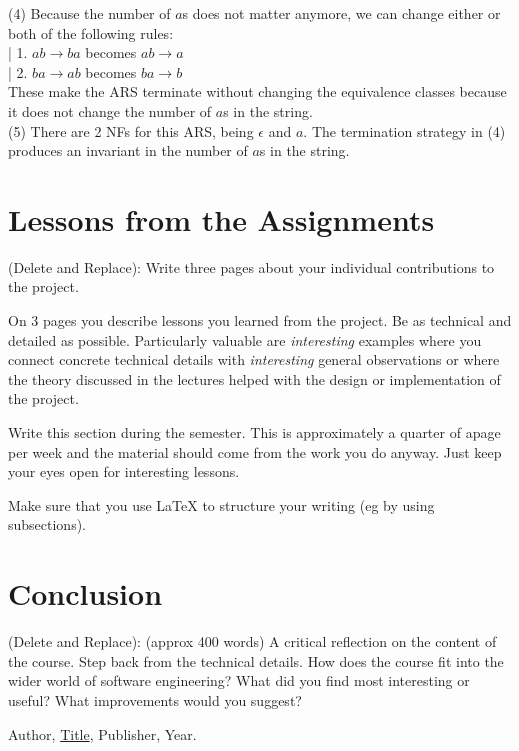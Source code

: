 \documentclass{article}
\theoremstyle{theorem}
\theoremstyle{definition}
\theoremstyle{remark}
\begin{document}
  (4) Because the number of $a$s does not matter anymore, we can change either or both of the following rules:\\
    |    1. $ab \rightarrow ba$ becomes $ab \rightarrow a$\\
    |    2. $ba \rightarrow ab$ becomes $ba \rightarrow b$\\
    These make the ARS terminate without changing the equivalence classes because it does not change the number of $a$s in the string.\\

  (5) There are 2 NFs for this ARS, being $\epsilon$ and $a$. The termination strategy in (4) produces an invariant in the number of $a$s in the string.\\

\section{Lessons from the Assignments}

(Delete and Replace): Write three pages about your individual contributions to the project.

On 3 pages you describe lessons you learned from the project. Be as technical and detailed as possible. Particularly valuable are \emph{interesting} examples where you connect concrete technical details with \emph{interesting} general observations or where the theory discussed in the lectures helped with the design or implementation of the project.

Write this section during the semester. This is approximately a quarter of apage per week and the material should come from the work you do anyway. Just keep your eyes open for interesting lessons.

Make sure that you use \LaTeX{} to structure your writing (eg by using subsections).

\section{Conclusion}\label{conclusion}

(Delete and Replace): (approx 400 words) A critical reflection on the content of the course. Step back from the technical details. How does the course fit into the wider world of software engineering? What did you find most interesting or useful? What improvements would you suggest?

\begin{thebibliography}{99}
 Author, \href{https://en.wikipedia.org/wiki/LaTeX}{Title}, Publisher, Year.
\end{thebibliography}
\end{document}
